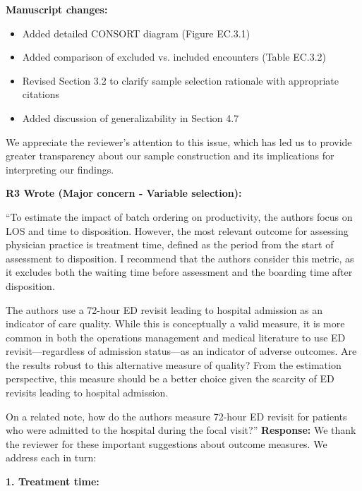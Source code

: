 \documentclass[11pt]{article}
\newenvironment{quote2}
{ \bigskip
\noindent
         \small\em
         \baselineskip=14pt
}
\newcommand{\1}{\hbox{\rm 1\kern-.35em 1}}
\begin{document}
\textbf{Manuscript changes:}

\begin{itemize}
\item Added detailed CONSORT diagram (Figure EC.3.1)
\item Added comparison of excluded vs. included encounters (Table EC.3.2)
\item Revised Section 3.2 to clarify sample selection rationale with appropriate citations
\item Added discussion of generalizability in Section 4.7 
\end{itemize}

We appreciate the reviewer's attention to this issue, which has led us to provide greater transparency about our sample construction and its implications for interpreting our findings.

\color{black}



\begin{quote2}
\textbf{R3 Wrote (Major concern -  Variable selection):}  

\noindent``To estimate the impact of batch ordering on productivity, the authors focus on LOS and time to disposition. However, the most relevant outcome for assessing physician practice is treatment time, defined as the period from the start of assessment to disposition. I recommend that the authors consider this metric, as it excludes both the waiting time before assessment and the boarding time after disposition.

The authors use a 72-hour ED revisit leading to hospital admission as an indicator of care quality. While this is conceptually a valid measure, it is more common in both the operations management and medical literature to use ED revisit—regardless of admission status—as an indicator of adverse outcomes. Are the results robust to this alternative measure of quality? From the estimation perspective, this measure should be a better choice given the scarcity of ED revisits leading to hospital admission.

On a related note, how do the authors measure 72-hour ED revisit for patients who were admitted to the hospital during the focal visit?''
\end{quote2}

\noindent\textbf{Response:} \color{blue}We thank the reviewer for these important suggestions about outcome measures. We address each in turn:

\textbf{1. Treatment time:} 
\end{document}
